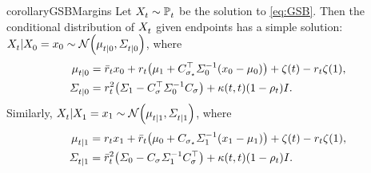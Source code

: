 \begin{restatable}{corollary}{GSBMargins}
\label{cor:GSB-Margins}
Let $X^{}_{ t } \sim \mathbb{P}^{}_{ t }$ be the solution to \eqref{eq:GSB}. Then the conditional distribution of $X^{}_{ t }$ given endpoints has a simple solution: $\Xsol \vert \Xsol[0] = x_0 \sim \Ncal\parens*{  \cmeansol{\ctime}{0}, \cSigmasol{\ctime}{0} }$, where
\begin{align}
\cmeansol{\ctime}{0} 
&= \ratioc x_0 + \ratio \parens*{   \malt + C_{\sigma_\star}^\top \covar^{-1}(x_0 - \m) } + \tshift - \ratio \tshift[\horizon], %
\label{eq:cmean-marginal-0}
\\
\cSigmasol{\ctime}{0} &= \ratio^2 \parens*{ \covaralt - \Cstar^\top \covar^{-1}\Cstar } + \kernel[\ctime][\ctime]  \parens*{ 1- \efftr } \eye. %
\label{eq:csigma-marginal-0}
\end{align}
Similarly, $\Xsol \vert \Xsol[\horizon] = x_{\horizon} \sim \Ncal\parens*{  \cmeansol{\ctime}{\horizon}, \cSigmasol{\ctime}{\horizon} }$, where
\begin{align}
\cmeansol{\ctime}{\horizon} 
&= \ratio x_{\horizon} + \ratioc \parens*{   \m + C_{\sigma_\star} \covaralt^{-1}(x_{\horizon} - \malt) } + \tshift - \ratio \tshift[\horizon], %
\label{eq:cmean-marginal-T} \\
\cSigmasol{\ctime}{\horizon} &= \ratioc^2 \parens*{ \covar - \Cstar \covaralt^{-1}\Cstar^{\top} } + \kernel[\ctime][\ctime]  \parens*{ 1- \efftr } \eye. %
\label{eq:csigma-marginal-T}
\end{align}
\end{restatable}

